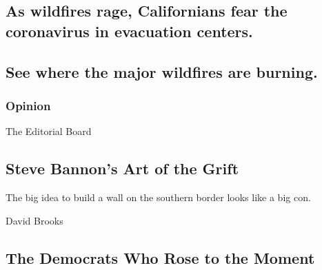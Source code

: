 \href{/2020/08/20/us/ca-wildfires-covid.html}{}

\hypertarget{as-wildfires-rage-californians-fear-the-coronavirus-in-evacuation-centers}{%
\subsection{As wildfires rage, Californians fear the coronavirus in
evacuation
centers.}\label{as-wildfires-rage-californians-fear-the-coronavirus-in-evacuation-centers}}

\href{/interactive/2020/08/20/us/california-wildfire-maps.html}{}

\href{/interactive/2020/08/20/us/california-wildfire-maps.html}{}

\hypertarget{see-where-the-major-wildfires-are-burning}{%
\subsection{See where the major wildfires are
burning.}\label{see-where-the-major-wildfires-are-burning}}

\href{https://www.nytimes3xbfgragh.onion/section/opinion?pagetype=Homepage\&action=click\&module=Opinion}{}

\hypertarget{opinion}{%
\subsubsection{Opinion}\label{opinion}}

\href{/2020/08/20/opinion/steve-bannon-trump-arrested.html}{}

The Editorial Board

\hypertarget{steve-bannons-art-of-the-grift}{%
\subsection{Steve Bannon's Art of the
Grift}\label{steve-bannons-art-of-the-grift}}

The big idea to build a wall on the southern border looks like a big
con.

\href{/2020/08/20/opinion/democratic-convention-warren-biden-obama.html}{}

David Brooks

\hypertarget{the-democrats-who-rose-to-the-moment}{%
\subsection{The Democrats Who Rose to the
Moment}\label{the-democrats-who-rose-to-the-moment}}

